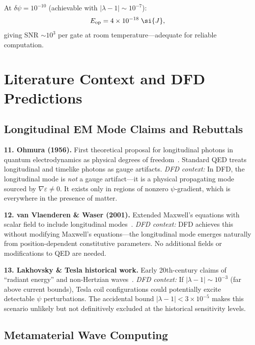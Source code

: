 \documentclass[aps,prd,twocolumn,superscriptaddress,nofootinbib,floatfix]{revtex4-2}
\newcommand{\ee}[1]{\times 10^{#1}}
\begin{document}
At $\delta\psi = 10^{-10}$ (achievable with $|\lambda-1| \sim 10^{-7}$):
\begin{equation}
E_{\rm op} = 4\ee{-18}\;\si{J},
\end{equation}
giving SNR $\sim 10^3$ per gate at room temperature---adequate
for reliable computation.

\section{Literature Context and DFD Predictions}
\label{sec:literature}

\subsection{Longitudinal EM Mode Claims and Rebuttals}

\textbf{11. Ohmura (1956).} First theoretical proposal for
longitudinal photons in quantum electrodynamics as physical
degrees of freedom~\cite{Ohmura1956}.  Standard QED treats
longitudinal and timelike photons as gauge artifacts.
\textit{DFD context:} In DFD, the longitudinal mode is
\emph{not} a gauge artifact---it is a physical propagating
mode sourced by $\nabla\varepsilon \neq 0$.  It exists only
in regions of nonzero $\psi$-gradient, which is everywhere
in the presence of matter.

\textbf{12. van Vlaenderen \& Waser (2001).} Extended
Maxwell's equations with scalar field to include longitudinal
modes~\cite{vanVlaenderen2001}.  \textit{DFD context:}
DFD achieves this without modifying Maxwell's equations---the
longitudinal mode emerges naturally from position-dependent
constitutive parameters.  No additional fields or modifications
to QED are needed.

\textbf{13. Lakhovsky \& Tesla historical work.}  Early
20th-century claims of ``radiant energy'' and non-Hertzian
waves~\cite{Tesla1904}.  \textit{DFD context:} If
$|\lambda-1| \sim 10^{-3}$ (far above current bounds),
Tesla coil configurations could potentially excite detectable
$\psi$ perturbations.  The accidental bound $|\lambda-1| < 3\ee{-5}$
makes this scenario unlikely but not definitively excluded at
the historical sensitivity levels.

\subsection{Metamaterial Wave Computing}
\end{document}
